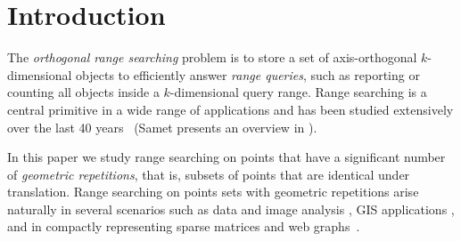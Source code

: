 \section{Introduction}
The \emph{orthogonal range searching} problem is to store a set of axis-orthogonal $k$-dimensional objects to efficiently answer \emph{range queries}, such as reporting or counting all objects inside a $k$-dimensional query range. Range searching is a central primitive in a wide range of applications and has been studied extensively over the last 40 years~\cite{bentley1975multidimensional, bentley1979multidimensional, orenstein1982multidimensional, bentley1980decomposable, lueker1978data, lee1980quintary, guttman1984r, clarkson1983fast, kanth1999optimal, van1991dividedk, gaede1998multidimensional, bayer1972organization, arge2008priority, robinson1981kdb, procopiuc2003bkd, comer1979ubiquitous, eppstein2008skip} (Samet presents an overview in \cite{samet1990applications}). 

In this paper we study range searching on points that have a significant number of \emph{geometric repetitions}, that is, subsets of points that are identical under translation. Range searching on points sets with geometric repetitions arise naturally in several scenarios such as data and image analysis \cite{tetko2001pattern, pajarola2000image, dick2009a}, GIS applications \cite{schindler2008detecting, zhu2002efficient, haegler2010a, dick2009a}, and in compactly representing sparse matrices and web graphs~\cite{Galli98compressionof, brisaboa2009k2, brisaboaainterleaved, de2013compact}.

